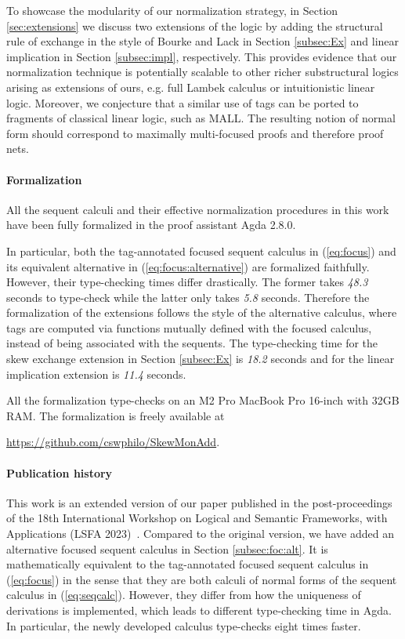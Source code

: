 \documentclass[submission,copyright,creativecommons]{eptcs}
\theoremstyle{definition}
\begin{document}
To showcase the modularity of our normalization strategy, in Section \ref{sec:extensions} we discuss two extensions of the logic by adding the structural rule of exchange in the style of Bourke and Lack in Section \ref{subsec:Ex} and linear implication in Section \ref{subsec:impl}, respectively.
This provides evidence that our normalization technique is potentially scalable to other richer substructural logics arising as extensions of ours, e.g. full Lambek calculus or intuitionistic linear logic.
Moreover, we conjecture that a similar use of tags can be ported to fragments of classical linear logic, such as MALL.
The resulting notion of normal form should correspond to maximally multi-focused proofs \cite{chaudhuri:canonical:2008} and therefore proof nets.

\paragraph{Formalization}
All the sequent calculi and their effective normalization procedures in this work have been fully formalized in the proof assistant Agda 2.8.0.

In particular, both the tag-annotated focused sequent calculus in (\ref{eq:focus}) and its equivalent alternative in (\ref{eq:focus:alternative}) are formalized faithfully. However, their type-checking times differ drastically. The former takes \emph{48.3} seconds to type-check while the latter only takes \emph{5.8} seconds.
Therefore the formalization of the extensions follows the style of the alternative calculus, where tags are computed via functions mutually defined with the focused calculus, instead of being associated with the sequents.
The type-checking time for the skew exchange extension in Section \ref{subsec:Ex} is \emph{18.2} seconds and for the linear implication extension is \emph{11.4} seconds.

All the formalization type-checks on an M2 Pro MacBook Pro 16-inch with 32GB RAM.
The formalization is freely available at
\begin{center}
  \url{https://github.com/cswphilo/SkewMonAdd}.
\end{center}

\paragraph{Publication history}
This work is an extended version of our paper published in the post-proceedings of the 18th International Workshop on Logical and Semantic Frameworks, with Applications (LSFA 2023)~\cite{VW:2023}.
Compared to the original version, we have added an alternative focused sequent calculus in Section \ref{subsec:foc:alt}. It is mathematically equivalent to the tag-annotated focused sequent calculus in (\ref{eq:focus}) in the sense that they are both calculi of normal forms of the sequent calculus in (\ref{eq:seqcalc}).
However, they differ from how the uniqueness of derivations is implemented, which leads to different type-checking time in Agda. In particular, the newly developed calculus type-checks eight times faster.
\end{document}
